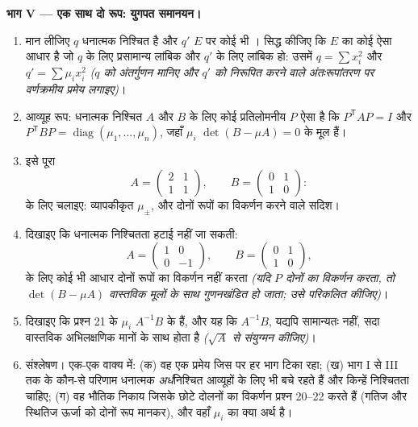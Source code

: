 \begin{problem}
\medskip
\noindent\textbf{भाग V --- एक साथ दो रूप: युगपत समानयन।}
\begin{enumerate}[resume]
  \item मान लीजिए $q$ धनात्मक निश्चित है और $q'$ $E$ पर कोई भी । सिद्ध कीजिए कि $E$ का कोई ऐसा आधार है जो $q$ के लिए प्रसामान्य
        लांबिक और $q'$ के लिए लांबिक हो: उसमें $q = \sum x_i^2$ और $q' = \sum \mu_i
        x_i^2$ \emph{($q$ को
        अंतर्गुणन मानिए और $q'$ को निरूपित करने वाले अंतःरूपांतरण पर
        वर्णक्रमीय प्रमेय लगाइए)}।
  \item आव्यूह रूप: धनात्मक निश्चित $A$ और  $B$ के लिए कोई
        प्रतिलोमनीय $P$ ऐसा है कि $P^{\mathsf T}AP = I$ और $P^{\mathsf T}BP =
        \operatorname{diag}(\mu_1, \dots, \mu_n)$, जहाँ $\mu_i$ $\det(B - \mu A) = 0$ के मूल
        हैं।
  \item इसे पूरा
        \[
        A = \begin{pmatrix} 2 & 1\\ 1 & 1 \end{pmatrix},
        \qquad
        B = \begin{pmatrix} 0 & 1\\ 1 & 0 \end{pmatrix} :
        \]
        के लिए चलाइए: व्यापकीकृत  $\mu_\pm$, और दोनों रूपों का
        विकर्णन करने वाले सदिश।
  \item दिखाइए कि धनात्मक निश्चितता हटाई नहीं जा सकती:
        \[
        A = \begin{pmatrix} 1 & 0\\ 0 & -1 \end{pmatrix},
        \qquad
        B = \begin{pmatrix} 0 & 1\\ 1 & 0 \end{pmatrix},
        \]
        के लिए कोई भी आधार दोनों रूपों का विकर्णन नहीं करता \emph{(यदि
        $P$ दोनों का विकर्णन करता, तो $\det(B - \mu A)$ वास्तविक मूलों के साथ
        गुणनखंडित हो जाता; उसे परिकलित कीजिए)}।
  \item दिखाइए कि प्रश्न 21 के $\mu_i$ $A^{-1}B$ के  हैं, और यह कि
        $A^{-1}B$, यद्यपि सामान्यतः  नहीं, सदा वास्तविक अभिलक्षणिक मानों
        के साथ  होता है \emph{($\sqrt A$ से संयुग्मन कीजिए)}।
  \item संश्लेषण। एक-एक वाक्य में: (क) वह एक प्रमेय जिस पर हर भाग टिका
        रहा; (ख) भाग I से III तक के कौन-से परिणाम धनात्मक \emph{अर्ध}निश्चित
        आव्यूहों के लिए भी बचे रहते हैं और किन्हें निश्चितता चाहिए; (ग)
        वह भौतिक निकाय जिसके छोटे दोलनों का विकर्णन प्रश्न 20--22 करते
        हैं (गतिज और स्थितिज ऊर्जा को दोनों रूप मानकर), और वहाँ $\mu_i$ का
        क्या अर्थ है।
\end{enumerate}
\end{problem}
